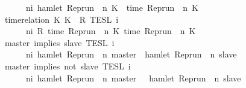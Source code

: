 \begin{isabellebody}
\ \ \ \ \ \ {\isacharbraceleft}{\isasymrho}{\isachardot}\ {\isasymexists}n{\isasymge}i{\isachardot}\ hamlet\ {\isacharparenleft}{\isacharparenleft}Rep{\isacharunderscore}run\ {\isasymrho}{\isacharparenright}\ n\ K\ {\isasymand}\ time\ {\isacharparenleft}{\isacharparenleft}Rep{\isacharunderscore}run\ {\isasymrho}{\isacharparenright}\ n\ K\ {\isacharequal}\ {\isasymtau}{\isacharbraceright}{\isacartoucheclose}\isanewline
{\isacharbar}\ {\isacartoucheopen}{\isasymlbrakk}\ time{\isacharminus}relation\ {\isasymlfloor}K\ K\ {\isasymin}\ R\ {\isasymrbrakk}\isactrlsub T\isactrlsub E\isactrlsub S\isactrlsub L\isactrlbsup {\isasymge}\ i\isactrlesup \ {\isacharequal}\isanewline
\ \ \ \ \ \ {\isacharbraceleft}{\isasymrho}{\isachardot}\ {\isasymforall}n{\isasymge}i{\isachardot}\ R\ {\isacharparenleft}time\ {\isacharparenleft}{\isacharparenleft}Rep{\isacharunderscore}run\ {\isasymrho}{\isacharparenright}\ n\ K\ time\ {\isacharparenleft}{\isacharparenleft}Rep{\isacharunderscore}run\ {\isasymrho}{\isacharparenright}\ n\ K\isanewline
{\isacharbar}\ {\isacartoucheopen}{\isasymlbrakk}\ master\ implies\ slave\ {\isasymrbrakk}\isactrlsub T\isactrlsub E\isactrlsub S\isactrlsub L\isactrlbsup {\isasymge}\ i\isactrlesup \ {\isacharequal}\isanewline
\ \ \ \ \ \ {\isacharbraceleft}{\isasymrho}{\isachardot}\ {\isasymforall}n{\isasymge}i{\isachardot}\ hamlet\ {\isacharparenleft}{\isacharparenleft}Rep{\isacharunderscore}run\ {\isasymrho}{\isacharparenright}\ n\ master{\isacharparenright}\ {\isasymlongrightarrow}\ hamlet\ {\isacharparenleft}{\isacharparenleft}Rep{\isacharunderscore}run\ {\isasymrho}{\isacharparenright}\ n\ slave{\isacharparenright}{\isacharbraceright}{\isacartoucheclose}\isanewline
{\isacharbar}\ {\isacartoucheopen}{\isasymlbrakk}\ master\ implies\ not\ slave\ {\isasymrbrakk}\isactrlsub T\isactrlsub E\isactrlsub S\isactrlsub L\isactrlbsup {\isasymge}\ i\isactrlesup \ {\isacharequal}\isanewline
\ \ \ \ \ \ {\isacharbraceleft}{\isasymrho}{\isachardot}\ {\isasymforall}n{\isasymge}i{\isachardot}\ hamlet\ {\isacharparenleft}{\isacharparenleft}Rep{\isacharunderscore}run\ {\isasymrho}{\isacharparenright}\ n\ master{\isacharparenright}\ {\isasymlongrightarrow}\ {\isasymnot}\ hamlet\ {\isacharparenleft}{\isacharparenleft}Rep{\isacharunderscore}run\ {\isasymrho}{\isacharparenright}\ n\ slave{\isacharparenright}{\isacharbraceright}{\isacartoucheclose}\isanewline

\end{isabellebody}
